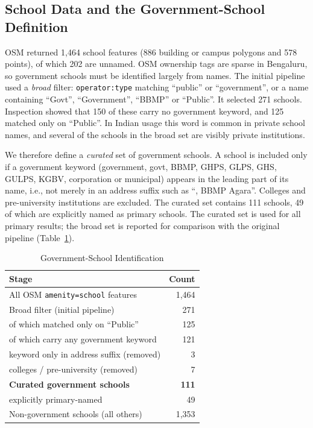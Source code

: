 \documentclass[conference]{IEEEtran}
\begin{document}
\subsection{School Data and the Government-School Definition}
OSM returned 1,464 school features (886 building or campus polygons and 578 points), of which 202 are unnamed. OSM ownership tags are sparse in Bengaluru, so government schools must be identified largely from names. The initial pipeline used a \emph{broad} filter: \texttt{operator:type} matching ``public'' or ``government'', or a name containing ``Govt'', ``Government'', ``BBMP'' or ``Public''. It selected 271 schools. Inspection showed that 150 of these carry no government keyword, and 125 matched only on ``Public''. In Indian usage this word is common in private school names, and several of the schools in the broad set are visibly private institutions.

We therefore define a \emph{curated} set of government schools. A school is included only if a government keyword (government, govt, BBMP, GHPS, GLPS, GHS, GULPS, KGBV, corporation or municipal) appears in the leading part of its name, i.e., not merely in an address suffix such as ``, BBMP Agara''. Colleges and pre-university institutions are excluded. The curated set contains 111 schools, 49 of which are explicitly named as primary schools. The curated set is used for all primary results; the broad set is reported for comparison with the original pipeline (Table~\ref{tab:schools}).

\begin{table}[!t]
\centering
\caption{Government-School Identification}
\label{tab:schools}
\footnotesize
\begin{tabular}{@{}lr@{}}
\toprule
\textbf{Stage} & \textbf{Count} \\
\midrule
All OSM \texttt{amenity=school} features & 1,464 \\
Broad filter (initial pipeline) & 271 \\
\quad of which matched only on ``Public'' & 125 \\
\quad of which carry any government keyword & 121 \\
\quad keyword only in address suffix (removed) & 3 \\
\quad colleges / pre-university (removed) & 7 \\
\textbf{Curated government schools} & \textbf{111} \\
\quad explicitly primary-named & 49 \\
Non-government schools (all others) & 1,353 \\
\bottomrule
\end{tabular}
\end{table}
\end{document}

